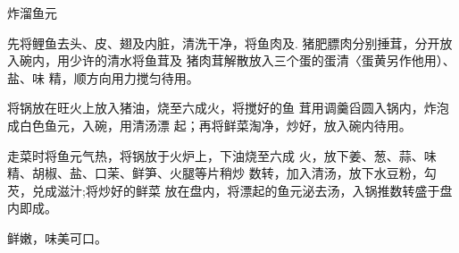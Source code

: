 \begin{recipe}{炸溜鱼元}

\ingredients



\cooking

\step 先将鲤鱼去头、皮、翅及内脏，清洗干净，将鱼肉及. 猪肥膘肉分别捶茸，分开放入碗内，用少许的清水将鱼茸及 猪肉茸解散放入三个蛋的蛋清〈蛋黄另作他用）、盐、味 精，顺方向用力搅匀待用。

\step 将锅放在旺火上放入猪油，烧至六成火，将搅好的鱼 茸用调羹舀圆入锅内，炸泡成白色鱼元，入碗，用清汤漂 起；再将鲜菜淘净，炒好，放入碗内待用。

\step 走菜时将鱼元气热，将锅放于火炉上，下油烧至六成 火，放下姜、葱、蒜、味精、胡椒、盐、口茉、鲜笋、火腿等片稍炒 数转，加入清汤，放下水豆粉，勾芡，兑成滋汁;将炒好的鲜菜 放在盘内，将漂起的鱼元泌去汤，入锅推数转盛于盘内即成。

\notes

鲜嫩，味美可口。

\end{recipe}

